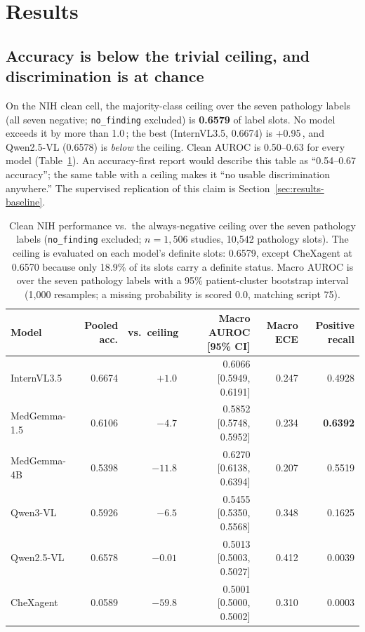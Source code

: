 \section{Results}
\label{sec:results}

\subsection{Accuracy is below the trivial ceiling, and discrimination is at chance}
\label{sec:results-accuracy}

On the NIH clean cell, the majority-class ceiling over the seven pathology labels (all seven negative; \texttt{no\_finding} excluded) is \textbf{0.6579} of label slots. No model exceeds it by more than 1.0\,\pp{}; the best (InternVL3.5, 0.6674) is +0.95\,\pp{}, and Qwen2.5-VL (0.6578) is \emph{below} the ceiling. Clean AUROC is 0.50--0.63 for every model (Table~\ref{tab:clean}). An accuracy-first report would describe this table as ``0.54--0.67 accuracy''; the same table with a ceiling makes it ``no usable discrimination anywhere.'' The supervised replication of this claim is Section~\ref{sec:results-baseline}.

\begin{table}[t]
\centering
\small
\caption{Clean NIH performance vs.\ the always-negative ceiling over the seven pathology labels (\texttt{no\_finding} excluded; $n=1{,}506$ studies, 10,542 pathology slots). The ceiling is evaluated on each model's definite slots: 0.6579, except CheXagent at 0.6570 because only 18.9\% of its slots carry a definite status. Macro AUROC is over the seven pathology labels with a 95\% patient-cluster bootstrap interval (1,000 resamples; a missing probability is scored 0.0, matching script 75).}
\label{tab:clean}
\begin{tabular}{lrrrrr}
\toprule
Model & Pooled acc. & vs.\ ceiling & Macro AUROC [95\% CI] & Macro ECE & Positive recall \\
\midrule
InternVL3.5 & 0.6674 & $+1.0$\,\pp{} & 0.6066 [0.5949, 0.6191] & 0.247 & 0.4928 \\
MedGemma-1.5 & 0.6106 & $-4.7$\,\pp{} & 0.5852 [0.5748, 0.5952] & 0.234 & \textbf{0.6392} \\
MedGemma-4B & 0.5398 & $-11.8$\,\pp{} & 0.6270 [0.6138, 0.6394] & 0.207 & 0.5519 \\
Qwen3-VL & 0.5926 & $-6.5$\,\pp{} & 0.5455 [0.5350, 0.5568] & 0.348 & 0.1625 \\
Qwen2.5-VL & 0.6578 & $\mathbf{-0.01}$\,\pp{} & 0.5013 [0.5003, 0.5027] & 0.412 & 0.0039 \\
CheXagent & 0.0589 & $-59.8$\,\pp{} & 0.5001 [0.5000, 0.5002] & 0.310 & 0.0003 \\
\bottomrule
\end{tabular}
\end{table}

